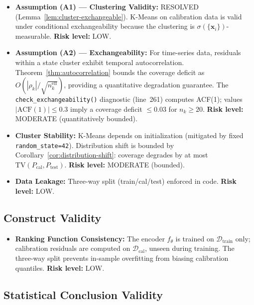 \documentclass[11pt]{article}
\newcommand{\cD}{\mathcal{D}}
\begin{document}
\begin{itemize}
    \item \textbf{Assumption (A1) — Clustering Validity:} RESOLVED (Lemma~\ref{lem:cluster-exchangeable}). K-Means on calibration data is valid under conditional exchangeability because the clustering is $\sigma(\{\mathbf{x}_i\})$-measurable. \textbf{Risk level:} LOW.

    \item \textbf{Assumption (A2) — Exchangeability:} For time-series data, residuals within a state cluster exhibit temporal autocorrelation. Theorem~\ref{thm:autocorrelation} bounds the coverage deficit as $O(|\rho_k|/\sqrt{n_k^{\text{eff}}})$, providing a quantitative degradation guarantee. The \texttt{check\_exchangeability()} diagnostic (line~261) computes ACF(1); values $|\text{ACF}(1)| \leq 0.3$ imply a coverage deficit $\leq 0.03$ for $n_k \geq 20$. \textbf{Risk level:} MODERATE (quantitatively bounded).

    \item \textbf{Cluster Stability:} K-Means depends on initialization (mitigated by fixed \texttt{random\_state=42}). Distribution shift is bounded by Corollary~\ref{cor:distribution-shift}: coverage degrades by at most $\text{TV}(P_{\text{cal}}, P_{\text{test}})$. \textbf{Risk level:} MODERATE (bounded).

    \item \textbf{Data Leakage:} Three-way split (train/cal/test) enforced in code. \textbf{Risk level:} LOW.
\end{itemize}

\subsection*{Construct Validity}

\begin{itemize}
    \item \textbf{Ranking Function Consistency:} The encoder $f_\theta$ is trained on $\cD_{\text{train}}$ only; calibration residuals are computed on $\cD_{\text{cal}}$, unseen during training. The three-way split prevents in-sample overfitting from biasing calibration quantiles. \textbf{Risk level:} LOW.
\end{itemize}

\subsection*{Statistical Conclusion Validity}
\end{document}
